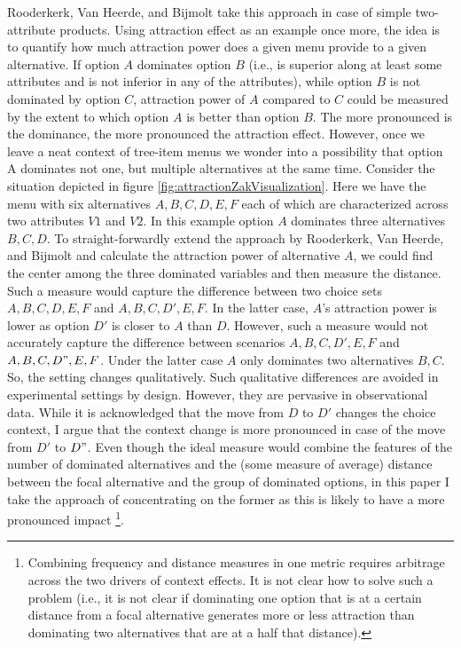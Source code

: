 \documentclass[a4paper,12pt]{article}
\newcommand{\citeyearonly}[1]{\citeyearpar{#1}}
\begin{document}
Rooderkerk, Van Heerde, and Bijmolt \citeyearonly{roodrkerkEtAl11} take this approach in case of simple two-attribute products. Using attraction effect as an example once more, the idea is to quantify how much attraction power does a given menu provide to a given alternative. If option $A$ dominates option $B$ (i.e., is superior along at least some attributes and is not inferior in any of the attributes), while option $B$ is not dominated by option $C$, attraction power of $A$ compared to $C$ could be measured by the extent to which option $A$ is better than option $B$. The more pronounced is the dominance, the more pronounced the attraction effect. However, once we leave a neat context of tree-item menus we wonder into a possibility that option A dominates not one, but multiple alternatives at the same time. Consider the situation depicted in figure \ref{fig:attractionZakVisualization}. Here we have the menu with six alternatives ${A, B, C, D, E, F}$ each of which are characterized across two attributes $V1$ and $V2$. In this example option $A$ dominates three alternatives ${B, C, D}$. To straight-forwardly extend the approach by Rooderkerk, Van Heerde, and Bijmolt \citeyearonly{roodrkerkEtAl11} and calculate the attraction power of alternative $A$, we could find the center among the three dominated variables and then measure the distance. Such a measure would capture the difference between two choice sets ${A, B, C, D, E, F}$ and ${A, B, C, D', E, F}$. In the latter case, $A$’s attraction power is lower as option $D'$ is closer to $A$ than $D$. However, such a measure would not accurately capture the difference between scenarios ${A, B, C, D', E, F}$ and ${A, B, C, D", E, F}$. Under the latter case $A$ only dominates two alternatives ${B, C}$. So, the setting changes qualitatively. Such qualitative differences are avoided in experimental settings by design. However, they are pervasive in observational data. While it is acknowledged that the move from $D$ to $D'$ changes the choice context, I argue that the context change is more pronounced in case of the move from $D'$ to $D"$. Even though the ideal measure would combine the features of the number of dominated alternatives and the (some measure of average) distance between the focal alternative and the group of dominated options, in this paper I take the approach of concentrating on the former as this is likely to have a more pronounced impact \footnote{Combining frequency and distance measures in one metric requires arbitrage across the two drivers of context effects. It is not clear how to solve such a problem (i.e., it is not clear if dominating one option that is at a certain distance from a focal alternative generates more or less attraction than dominating two alternatives that are at a half that distance).}. 
\end{document}
